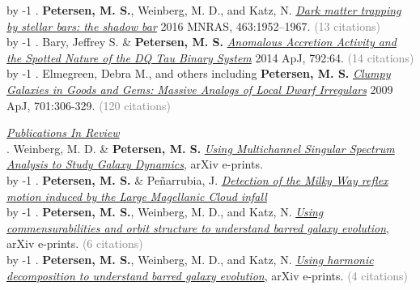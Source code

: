 \advance\TotalPublications by -1\relax
\the\TotalPublications.   {\bf \textcolor{blueshade}{Petersen, M. S.}}, Weinberg, M. D., and Katz, N. \href{http://adsabs.harvard.edu/abs/2016MNRAS.463.1952P}{\it
  Dark matter trapping by stellar bars: the shadow bar} 2016 MNRAS,
463:1952–1967. \ifcitationnumbers \textcolor{grey}{(13 citations)} \fi\\
\ifselectedpublications \else
\advance\TotalPublications by -1\relax
\the\TotalPublications.   Bary, Jeffrey S. \& {\bf \textcolor{blueshade}{Petersen, M. S.}}
\href{http://adsabs.harvard.edu/abs/2014ApJ...792...64B}{\it Anomalous
  Accretion Activity and the Spotted Nature of the DQ Tau Binary
  System} 2014 ApJ, 792:64. \ifcitationnumbers \textcolor{grey}{(14 citations)} \fi\\
\advance\TotalPublications by -1\relax
\the\TotalPublications.   Elmegreen, Debra M., and others including {\bf \textcolor{blueshade}{Petersen, M. S.}} \href{https://ui.adsabs.harvard.edu/abs/2009ApJ...701..306E/abstract}{\it Clumpy Galaxies in Goods and Gems: Massive Analogs of Local Dwarf Irregulars} 2009 ApJ, 701:306-329. \ifcitationnumbers \textcolor{grey}{(120 citations)} \fi\\ \fi


\underline{\sl Publications In Review} \\
\the\PublicationsInReview.  Weinberg, M. D. \& {\bf \textcolor{blueshade}{Petersen, M. S.}} \href{https://arxiv.org/abs/2009.07870}{\it Using Multichannel Singular Spectrum Analysis to Study
  Galaxy Dynamics}, arXiv e-prints. \\
\advance\PublicationsInReview by -1\relax
\the\PublicationsInReview.  {\bf \textcolor{blueshade}{Petersen, M. S.}} \& Pe{\~n}arrubia, J.  \href{https://michael-petersen.github.io}{\it Detection of the Milky Way reflex motion induced by the Large Magellanic Cloud infall}\\
\advance\PublicationsInReview by -1\relax
\the\PublicationsInReview.  {\bf \textcolor{blueshade}{Petersen, M. S.}}, Weinberg, M. D., and Katz, N. \href{https://ui.adsabs.harvard.edu/abs/2019arXiv190205081P/abstract}{\it Using commensurabilities and orbit structure to understand barred galaxy evolution}, arXiv e-prints. \ifcitationnumbers \textcolor{grey}{(6 citations)} \fi\\
\advance\PublicationsInReview by -1\relax
\the\PublicationsInReview.  {\bf \textcolor{blueshade}{Petersen, M. S.}}, Weinberg, M. D., and Katz, N. \href{https://ui.adsabs.harvard.edu/abs/2019arXiv190308203P/abstract}{\it Using harmonic decomposition to understand barred galaxy evolution}, arXiv e-prints. \ifcitationnumbers \textcolor{grey}{(4 citations)} \fi\\


